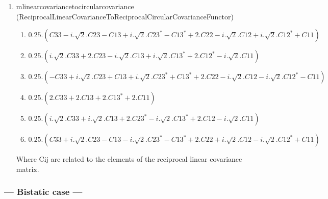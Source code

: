 \begin{enumerate}
\item mlinearcovariancetocircularcovariance (ReciprocalLinearCovarianceToReciprocalCircularCovarianceFunctor)
\begin{enumerate}
\item $ 0.25 . ( C33-i.\sqrt{2}.C23-C13+i.\sqrt{2}.C23^{*}-C13^{*}+2.C22-i.\sqrt{2}.C12+i.\sqrt{2}.C12^{*}+C11 ) $ 
\item $ 0.25 . ( i.\sqrt{2}.C33+2.C23-i.\sqrt{2}.C13+i.\sqrt{2}.C13^{*}+2.C12^{*}-i.\sqrt{2}.C11 ) $ 
\item $ 0.25 . ( -C33+i.\sqrt{2}.C23+C13+i.\sqrt{2}.C23^{*}+C13^{*}+2.C22-i.\sqrt{2}.C12-i.\sqrt{2}.C12^{*}-C11 ) $ 
\item $ 0.25 . ( 2.C33+2.C13+2.C13^{*}+2.C11 ) $ 
\item $ 0.25 . ( i.\sqrt{2}.C33+i.\sqrt{2}.C13+2.C23^{*}-i.\sqrt{2}.C13^{*}+2.C12-i.\sqrt{2}.C11 ) $ 
\item $ 0.25 . ( C33+i.\sqrt{2}.C23-C13-i.\sqrt{2}.C23^{*}-C13^{*}+2.C22+i.\sqrt{2}.C12-i.\sqrt{2}.C12^{*}+C11 ) $
\end{enumerate}

Where Cij are related to the elements of the reciprocal linear covariance matrix.
 
\end{enumerate}

\subsubsection{--- Bistatic case ---}

